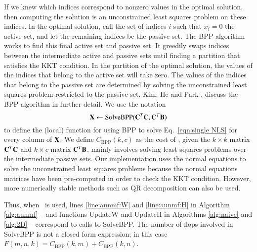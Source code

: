 If we knew which indices correspond to nonzero values in the optimal solution, then computing the solution is an unconstrained least squares problem on these indices.
In the optimal solution, call the set of indices $i$ such that $x_i=0$ the active set, and let the remaining indices be the passive set. The BPP algorithm works to find this final active set and passive set. 
It greedily swaps indices between the intermediate active and passive sets until finding a partition that satisfies the KKT condition. In the partition of the optimal solution, the values of the indices that belong to the active set will take zero. The values of the indices that belong to the passive set are determined by solving the unconstrained least squares problem restricted to the passive set. Kim, He and Park \cite{kim2011fast}, discuss the BPP algorithm in further detail. 
We use the notation
$$\mathbf{X} \gets \text{SolveBPP}(\mathbf{C}^T\mathbf{C},\mathbf{C}^T\mathbf{B})$$
to define the (local) function for using BPP to solve Eq.~\eqref{eqn:single NLS} for every column of $\mathbf{X}$.
We define $C_\text{BPP}(k,c)$ as the cost of , given the $k\times k$ matrix $\mathbf{C}^T\mathbf{C}$ and $k\times c$ matrix $\mathbf{C}^T\mathbf{B}$. 
 mainly involves solving least squares problems over the intermediate passive sets. 
Our implementation uses the normal equations to solve the unconstrained least squares problems because the normal equations matrices have been pre-computed in order to check the KKT condition.
However, more numerically stable methods such as QR decomposition can also be used.

Thus, when \BPP\ is used, lines \ref{line:aunmf:W} and \ref{line:aunmf:H} in Algorithm \ref{alg:aunmf} -- and functions UpdateW and UpdateH in Algorithms \ref{alg:naive} and \ref{alg:2D} -- correspond to calls to SolveBPP.
The number of flops involved in SolveBPP is not a closed form expression; in this case $F(m,n,k)=C_\text{BPP}(k,m)+ C_\text{BPP}(k,n)$.


